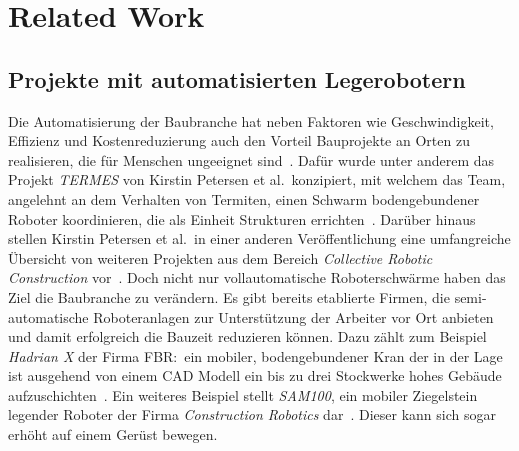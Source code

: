 \chapter{Related Work}\label{related}
\section{Projekte mit automatisierten Legerobotern}
Die Automatisierung der Baubranche hat neben Faktoren wie Geschwindigkeit, Effizienz und Kostenreduzierung auch den Vorteil Bauprojekte an Orten zu realisieren, die für Menschen ungeeignet sind~\cite{Petersen2012}.
Dafür wurde unter anderem das Projekt \textit{TERMES} von Kirstin Petersen et al.\ konzipiert, mit welchem das Team, angelehnt an dem Verhalten von Termiten, einen Schwarm bodengebundener Roboter koordinieren, die als Einheit Strukturen errichten~\cite{Petersen2012}.
Darüber hinaus stellen Kirstin Petersen et al.\ in einer anderen Veröffentlichung eine umfangreiche Übersicht von weiteren Projekten aus dem Bereich \textit{Collective Robotic Construction} vor~\cite{Petersen2019}.
Doch nicht nur vollautomatische Roboterschwärme haben das Ziel die Baubranche zu verändern.
Es gibt bereits etablierte Firmen, die semi-automatische Roboteranlagen zur Unterstützung der Arbeiter vor Ort anbieten und damit erfolgreich die Bauzeit reduzieren können.
Dazu zählt zum Beispiel \textit{Hadrian X} der Firma FBR:\ ein mobiler, bodengebundener Kran der in der Lage ist ausgehend von einem CAD Modell ein bis zu drei Stockwerke hohes Gebäude aufzuschichten~\cite{HadrianX}.
Ein weiteres Beispiel stellt \textit{SAM100}, ein mobiler Ziegelstein legender Roboter der Firma \textit{Construction Robotics} dar~\cite{SAM}.
Dieser kann sich sogar erhöht auf einem Gerüst bewegen.

